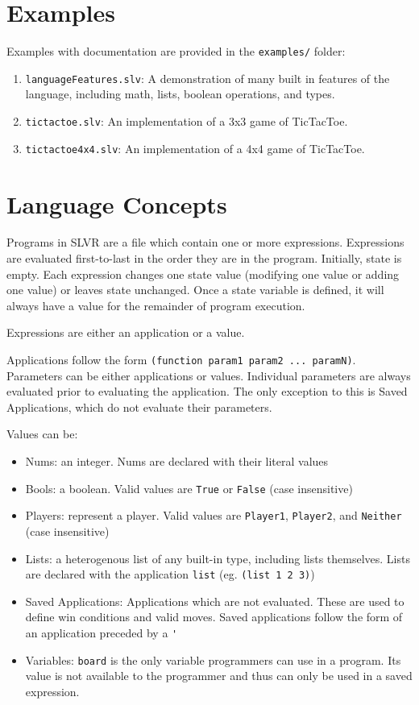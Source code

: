 \documentclass{article}
\begin{document}
\section{Examples}

Examples with documentation are provided in the \verb|examples/| folder:

\begin{enumerate}
\item \verb|languageFeatures.slv|: A demonstration of many built in features of the language, including math, lists, boolean operations, and types.
\item \verb|tictactoe.slv|: An implementation of a 3x3 game of TicTacToe.
\item \verb|tictactoe4x4.slv|: An implementation of a 4x4 game of TicTacToe. 
\end{enumerate}

\section{Language Concepts}

Programs in SLVR are a file which contain one or more expressions. Expressions are evaluated first-to-last in the order they are in the program. Initially, state is empty. Each expression changes one state value (modifying one value or adding one value) or leaves state unchanged. Once a state variable is defined, it will always have a value for the remainder of program execution. 

Expressions are either an application or a value.

Applications follow the form \verb|(function param1 param2 ... paramN)|. Parameters can be either applications or values. Individual parameters are always evaluated prior to evaluating the application. The only exception to this is Saved Applications, which do not evaluate their parameters.

Values can be:
\begin{itemize}
\item Nums: an integer. Nums are declared with their literal values
\item Bools: a boolean. Valid values are \verb|True| or \verb|False| (case insensitive)
\item Players: represent a player. Valid values are \verb|Player1|, \verb|Player2|, and \verb|Neither| (case insensitive)
\item Lists: a heterogenous list of any built-in type, including lists themselves. Lists are declared with the application \verb|list| (eg. \verb|(list 1 2 3)|)
\item Saved Applications: Applications which are not evaluated. These are used to define win conditions and valid moves. Saved applications follow the form of an application preceded by a \verb|'|
\item Variables: \verb|board| is the only variable programmers can use in a program. Its value is not available to the programmer and thus can only be used in a saved expression.
\end{itemize}
\end{document}
